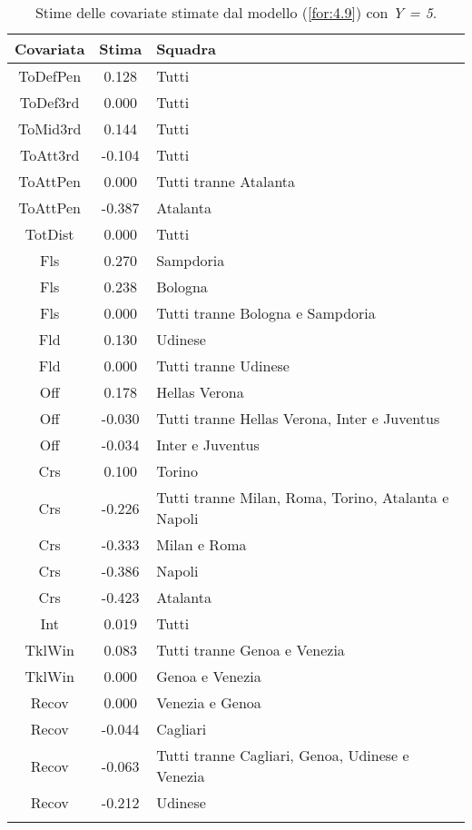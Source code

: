 \begin{table}[!htbp]%
	
	\renewcommand{\arraystretch}{1.7}
	\centering
	\begin{tabular}{ccp{10cm}}
		\hline			
		\textbf{Covariata} & \textbf{Stima} & \textbf{Squadra} \\	
		\hline
		ToDefPen & 0.128 & Tutti \\      
		ToDef3rd & 0.000 & Tutti \\
		ToMid3rd & 0.144 &Tutti\\
		ToAtt3rd & -0.104 & Tutti \\  
		ToAttPen & 0.000 & Tutti tranne Atalanta \\    
		ToAttPen & -0.387 & Atalanta \\ 	     	 
		TotDist & 0.000 & Tutti \\	
		Fls & 0.270 & Sampdoria  \\ 	
		Fls & 0.238 & Bologna  \\
		Fls & 0.000 & Tutti tranne Bologna e Sampdoria  \\
		Fld & 0.130 & Udinese  \\
		Fld & 0.000 & Tutti tranne Udinese \\
		Off & 0.178 & Hellas Verona\\
		Off & -0.030 & Tutti tranne Hellas Verona, Inter e Juventus\\
		Off & -0.034 & Inter e Juventus  \\
		Crs & 0.100 & Torino\\
		Crs & -0.226 & Tutti tranne Milan, Roma, Torino, Atalanta e Napoli\\
		Crs & -0.333 & Milan e Roma\\
		Crs & -0.386 & Napoli\\
		Crs & -0.423 & Atalanta\\
		Int & 0.019 & Tutti\\
		TklWin &  0.083 & Tutti tranne Genoa e Venezia \\ 
		TklWin &  0.000 & Genoa e Venezia \\ 
		Recov &  0.000 & Venezia e Genoa \\ 
		Recov &  -0.044 & Cagliari \\
		Recov &  -0.063 & Tutti tranne Cagliari, Genoa, Udinese e Venezia \\ 
		Recov &  -0.212 & Udinese \\ 
		\hline
		& &  \\
		
	\end{tabular} \hbox{}
	\caption{Stime delle covariate stimate dal modello (\ref{for:4.9}) con \emph{Y = 5}.} \label{tab:BTCL35} 
\end{table}
